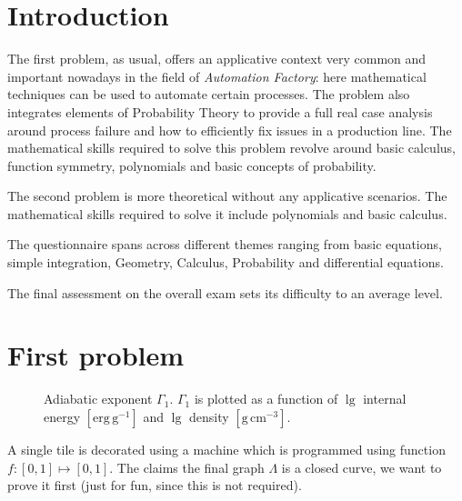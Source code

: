 \documentclass{layout}
\begin{document}
\section{Introduction}

The first problem, as usual, offers an applicative context very common and important
nowadays in the field of \emph{Automation Factory}: here mathematical techniques
can be used to automate certain processes. The problem also integrates elements of
Probability Theory to provide a full real case analysis around process failure and how
to efficiently fix issues in a production line. The mathematical skills required to solve
this problem revolve around basic calculus, function symmetry, polynomials and
basic concepts of probability.

The second problem is more theoretical without any applicative scenarios. The
mathematical skills required to solve it include polynomials and basic calculus.

The questionnaire spans across different themes ranging from basic equations,
simple integration, Geometry, Calculus, Probability and differential equations.

The final assessment on the overall exam sets its difficulty to an average level.

\section{First problem}

   \begin{figure*}
   \centering
   \caption{Adiabatic exponent $\Gamma_1$.
               $\Gamma_1$ is plotted as a function of
               $\lg$ internal energy $\mathrm{[erg\,g^{-1}]}$ and $\lg$
               density $\mathrm{[g\,cm^{-3}]}$.}
              \label{FigGam}%
    \end{figure*}
%


A single tile is decorated using a machine which is programmed using function 
$f:[0,1] \mapsto [0,1]$. The \cite{exam1} claims the final graph $\Lambda$ is
a closed curve, we want to prove it first (just for fun, since this is not required).
\end{document}
